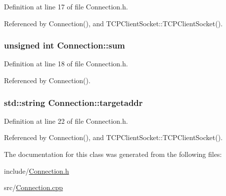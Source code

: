 Definition at line 17 of file Connection.\+h.



Referenced by Connection(), and T\+C\+P\+Client\+Socket\+::\+T\+C\+P\+Client\+Socket().

\hypertarget{classConnection_aca989af92a96ac113222d7b8640df507}{
\subsubsection[{sum}]{\setlength{\rightskip}{0pt plus 5cm}unsigned int Connection\+::sum\hspace{0.3cm}{\ttfamily [private]}}}\label{classConnection_aca989af92a96ac113222d7b8640df507}


Definition at line 18 of file Connection.\+h.



Referenced by Connection().

\hypertarget{classConnection_a04bb846a50a9357bab86238956940d65}{
\subsubsection[{targetaddr}]{\setlength{\rightskip}{0pt plus 5cm}std\+::string Connection\+::targetaddr}}\label{classConnection_a04bb846a50a9357bab86238956940d65}


Definition at line 22 of file Connection.\+h.



Referenced by Connection(), and T\+C\+P\+Client\+Socket\+::\+T\+C\+P\+Client\+Socket().



The documentation for this class was generated from the following files\+:\begin{DoxyCompactItemize}
\item 
include/\hyperlink{Connection_8h}{Connection.\+h}\item 
src/\hyperlink{Connection_8cpp}{Connection.\+cpp}\end{DoxyCompactItemize}
